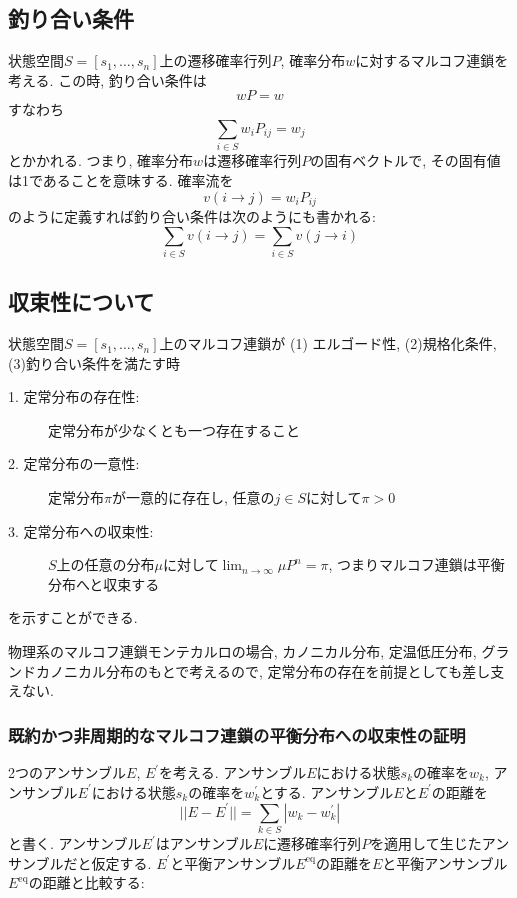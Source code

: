 \subsection{釣り合い条件}
状態空間$S = [s_{1}, \ldots, s_{n}]$上の遷移確率行列$P$, 確率分布$w$に対するマルコフ連鎖を考える.
この時, 釣り合い条件は
\begin{equation}
    w P = w
\end{equation}
すなわち
\begin{equation}
    \sum_{i \in S} w_{i} P_{ij} = w_{j}
\end{equation}
とかかれる.
つまり, 確率分布$w$は遷移確率行列$P$の固有ベクトルで, その固有値は1であることを意味する.
確率流を
\begin{equation}
    v(i \to j) = w_{i} P_{ij}
\end{equation}
のように定義すれば釣り合い条件は次のようにも書かれる:
\begin{equation}
    \sum_{i \in S} v(i \to j) = \sum_{i \in S} v(j \to i)
\end{equation}



\subsection{収束性について}
状態空間$S = [s_{1}, \ldots, s_{n}]$上のマルコフ連鎖が
(1) エルゴード性, (2)規格化条件, (3)釣り合い条件を満たす時

\begin{description}
    \item[1. 定常分布の存在性:] 定常分布が少なくとも一つ存在すること
    \item[2. 定常分布の一意性:] 定常分布$\pi$が一意的に存在し, 任意の$j \in S$に対して$\pi > 0$
    \item[3. 定常分布への収束性:] $S$上の任意の分布$\mu$に対して$\lim_{n\to\infty} \mu P^{n} = \pi$, つまりマルコフ連鎖は平衡分布へと収束する
\end{description}
を示すことができる.

物理系のマルコフ連鎖モンテカルロの場合, カノニカル分布, 定温低圧分布, グランドカノニカル分布のもとで考えるので, 定常分布の存在を前提としても差し支えない.

\subsubsection{既約かつ非周期的なマルコフ連鎖の平衡分布への収束性の証明}

2つのアンサンブル$E$, $E^{\prime}$を考える.
アンサンブル$E$における状態$s_{k}$の確率を$w_{k}$, アンサンブル$E^{\prime}$における状態$s_{k}$の確率を$w_{k}^{\prime}$とする.
アンサンブル$E$と$E^{\prime}$の距離を
\begin{equation}
    || E - E^{\prime} || = \sum_{k \in S} | w_{k} - w_{k}^{\prime} |
\end{equation}
と書く.
アンサンブル$E^{\prime}$はアンサンブル$E$に遷移確率行列$P$を適用して生じたアンサンブルだと仮定する.
$E^{\prime}$と平衡アンサンブル$E^{\mathrm{eq}}$の距離を$E$と平衡アンサンブル$E^{\mathrm{eq}}$の距離と比較する:

